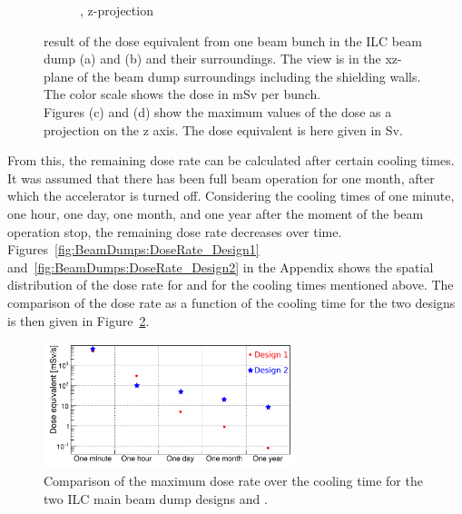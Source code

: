 \begin{figure}[!h]
\begin{subfigure}[b]{0.485\textwidth}
   \caption{\designtwo, z-projection}
   \end{subfigure}
   \caption[Dose equivalent in the ILC main beam dump]{\fluka result of the dose equivalent from one beam bunch in the ILC beam dump \designone (a) and \designtwo (b) and their surroundings.
   The view is in the xz-plane of the beam dump surroundings including the shielding walls.
   The color scale shows the dose in \si[detect-all]{\milli\sievert} per bunch.
   \\Figures (c) and (d) show the maximum values of the dose as a projection on the z axis.
   The dose equivalent is here given in \si[detect-all]{\sievert}.}
   \label{fig:BeamDumps:Dose}
\end{figure}
\FloatBarrier
From this, the remaining dose rate can be calculated after certain cooling times.
It was assumed that there has been full beam operation for one month, after which the accelerator is turned off.
Considering the cooling times of one minute, one hour, one day, one month, and one year after the moment of the beam operation stop, the remaining dose rate decreases over time.
Figures~\ref{fig:BeamDumps:DoseRate_Design1} and~\ref{fig:BeamDumps:DoseRate_Design2} in the Appendix shows the spatial distribution of the dose rate for \designone and \designtwo for the cooling times mentioned above.
The comparison of the dose rate as a function of the cooling time for the two designs is then given in Figure~\ref{fig:BeamDumps:DoseRate_Comparison}.
\begin{figure}[!h]
\centering
\includegraphics[width=0.65\textwidth]{Figures/BeamDump/DoseEQ_Time_Comparison.png}
\caption[Dose rate comparison of the ILC main beam dump designs]{Comparison of the maximum dose rate over the cooling time for the two ILC main beam dump designs \designone and \designtwo.}
\label{fig:BeamDumps:DoseRate_Comparison}
\end{figure}
